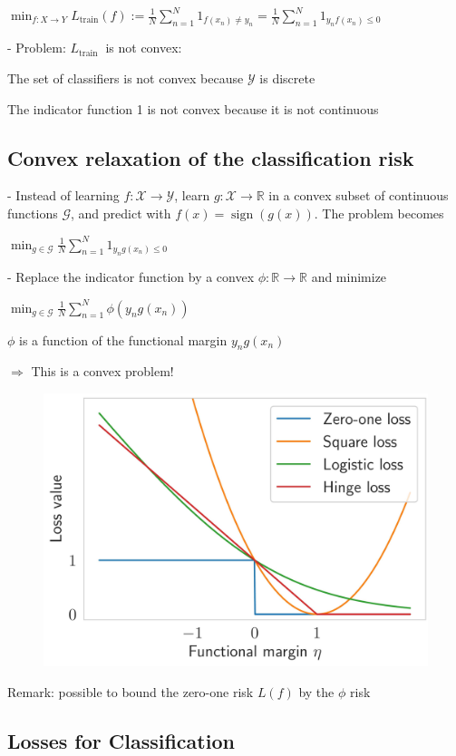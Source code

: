 $
\min _{f: X \rightarrow Y} L_{\operatorname{train}}(f):=\frac{1}{N} \sum_{n=1}^{N} 1_{f\left(x_{n}\right) \neq y_{n}}=\frac{1}{N} \sum_{n=1}^{N} 1_{y_{n} f\left(x_{n}\right) \leq 0}
$

- Problem: $L_{\text {train }}$ is not convex:

The set of classifiers is not convex because $\mathcal{Y}$ is discrete

The indicator function 1 is not convex because it is not continuous

\subsection*{Convex relaxation of the classification risk}

- Instead of learning $f: \mathscr{X} \rightarrow \mathscr{Y}$, learn $g: \mathscr{X} \rightarrow \mathbb{R}$ in a convex subset of continuous functions $\mathscr{G}$, and predict with $f(x)=\operatorname{sign}(g(x))$. The problem becomes

$
\min _{g \in \mathscr{G}} \frac{1}{N} \sum_{n=1}^{N} 1_{y_{n} g\left(x_{n}\right) \leq 0}
$

- Replace the indicator function by a convex $\phi: \mathbb{R} \rightarrow \mathbb{R}$ and minimize

$
\min _{g \in \mathscr{G}} \frac{1}{N} \sum_{n=1}^{N} \phi\left(y_{n} g\left(x_{n}\right)\right)
$

$\phi$ is a function of the functional margin $y_{n} g\left(x_{n}\right)$

$\Rightarrow$ This is a convex problem!

\begin{figure} 
    \includegraphics*[width=0.5\columnwidth]{figures/classification_losses2.jpg}
\end{figure}

Remark: possible to bound the zero-one risk $L(f)$ by the $\phi$ risk


\subsection*{Losses for Classification}

